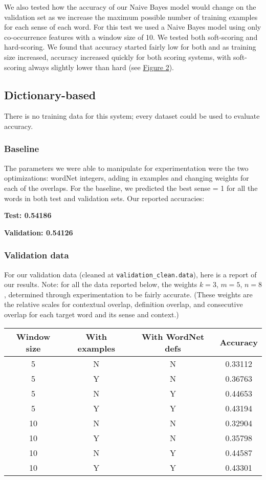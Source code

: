 \documentclass{article}
\begin{document}
We also tested how the accuracy of our Naive Bayes model would change on the validation set as we increase the maximum possible number of training examples for each sense of each word. For this test we used a Naive Bayes model using only co-occurrence features with a window size of 10. We tested both soft-scoring and hard-scoring. We found that accuracy started fairly low for both and as training size increased, accuracy increased quickly for both scoring systems, with soft-scoring always slightly lower than hard (see \hyperref[fig:size]{Figure 2}).

\subsection{Dictionary-based}
There is no training data for this system; every dataset could be used to evaluate accuracy.

\subsubsection{Baseline}

The parameters we were able to manipulate for experimentation were the two optimizations: wordNet integers, adding in examples and changing weights for each of the overlaps. For the baseline, we predicted the best sense = 1 for all the words in both test and validation sets. Our reported accuracies:\par
\textbf{Test: 0.54186}\par
\textbf{Validation: 0.54126}\par

\subsubsection{Validation data}
For our validation data (cleaned at \texttt{validation\_clean.data}), here is a report of our results. Note: for all the data reported below, the weights $k = 3$, $m = 5$, $n = 8$, determined through experimentation to be fairly accurate. (These weights are the relative scales for contextual overlap, definition overlap, and consecutive overlap for each target word and its sense and context.)

{\footnotesize\begin{tabular}{|c|c|c|c|}\hline
Window size & With examples & With WordNet defs & Accuracy\\\hline
5 & N & N & 0.33112\\
5 & Y & N & 0.36763\\
5 & N & Y & 0.44653\\
5 & Y & Y & 0.43194\\\hline
10 & N & N & 0.32904\\
10 & Y & N & 0.35798\\
10 & N & Y & 0.44587\\
10 & Y & Y & 0.43301\\\hline
\end{tabular}}
\end{document}
